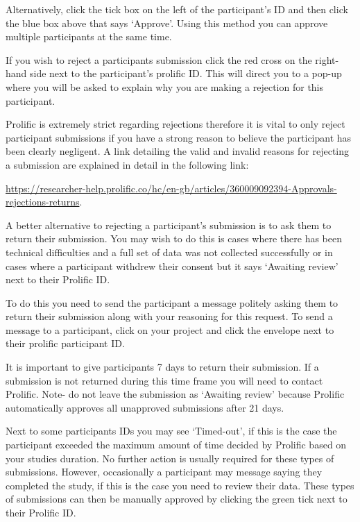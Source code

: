 \documentclass[
  12pt,
]{book}
\begin{document}
Alternatively, click the tick box on the left of the participant's ID and then click the blue box above that says `Approve'. Using this method you can approve multiple participants at the same time.

If you wish to reject a participants submission click the red cross on the right-hand side next to the participant's prolific ID. This will direct you to a pop-up where you will be asked to explain why you are making a rejection for this participant.

Prolific is extremely strict regarding rejections therefore it is vital to only reject participant submissions if you have a strong reason to believe the participant has been clearly negligent. A link detailing the valid and invalid reasons for rejecting a submission are explained in detail in the following link:

\url{https://researcher-help.prolific.co/hc/en-gb/articles/360009092394-Approvals-rejections-returns}.

A better alternative to rejecting a participant's submission is to ask them to return their submission. You may wish to do this is cases where there has been technical difficulties and a full set of data was not collected successfully or in cases where a participant withdrew their consent but it says `Awaiting review' next to their Prolific ID.

To do this you need to send the participant a message politely asking them to return their submission along with your reasoning for this request. To send a message to a participant, click on your project and click the envelope next to their prolific participant ID.

It is important to give participants 7 days to return their submission. If a submission is not returned during this time frame you will need to contact Prolific. Note- do not leave the submission as `Awaiting review' because Prolific automatically approves all unapproved submissions after 21 days.

Next to some participants IDs you may see `Timed-out', if this is the case the participant exceeded the maximum amount of time decided by Prolific based on your studies duration. No further action is usually required for these types of submissions. However, occasionally a participant may message saying they completed the study, if this is the case you need to review their data. These types of submissions can then be manually approved by clicking the green tick next to their Prolific ID.
\end{document}
